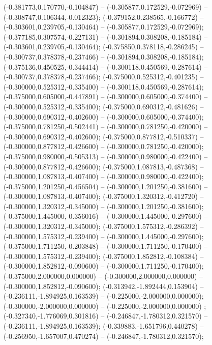  (-0.381773,0.170770,-0.104847) -- (-0.305877,0.172529,-0.072969) -- (-0.308747,0.106344,-0.012323);
 (-0.379152,0.238565,-0.166772) -- (-0.303601,0.239705,-0.130464) -- (-0.305877,0.172529,-0.072969);
 (-0.377185,0.307574,-0.227131) -- (-0.301894,0.308208,-0.185184) -- (-0.303601,0.239705,-0.130464);
 (-0.375850,0.378118,-0.286245) -- (-0.300737,0.378378,-0.237466) -- (-0.301894,0.308208,-0.185184);
 (-0.375136,0.450525,-0.344414) -- (-0.300118,0.450569,-0.287614) -- (-0.300737,0.378378,-0.237466);
 (-0.375000,0.525312,-0.401235) -- (-0.300000,0.525312,-0.335400) -- (-0.300118,0.450569,-0.287614);
 (-0.375000,0.605000,-0.447891) -- (-0.300000,0.605000,-0.374400) -- (-0.300000,0.525312,-0.335400);
 (-0.375000,0.690312,-0.481626) -- (-0.300000,0.690312,-0.402600) -- (-0.300000,0.605000,-0.374400);
 (-0.375000,0.781250,-0.502441) -- (-0.300000,0.781250,-0.420000) -- (-0.300000,0.690312,-0.402600);
 (-0.375000,0.877812,-0.510337) -- (-0.300000,0.877812,-0.426600) -- (-0.300000,0.781250,-0.420000);
 (-0.375000,0.980000,-0.505313) -- (-0.300000,0.980000,-0.422400) -- (-0.300000,0.877812,-0.426600);
 (-0.375000,1.087813,-0.487368) -- (-0.300000,1.087813,-0.407400) -- (-0.300000,0.980000,-0.422400);
 (-0.375000,1.201250,-0.456504) -- (-0.300000,1.201250,-0.381600) -- (-0.300000,1.087813,-0.407400);
 (-0.375000,1.320312,-0.412720) -- (-0.300000,1.320312,-0.345000) -- (-0.300000,1.201250,-0.381600);
 (-0.375000,1.445000,-0.356016) -- (-0.300000,1.445000,-0.297600) -- (-0.300000,1.320312,-0.345000);
 (-0.375000,1.575312,-0.286392) -- (-0.300000,1.575312,-0.239400) -- (-0.300000,1.445000,-0.297600);
 (-0.375000,1.711250,-0.203848) -- (-0.300000,1.711250,-0.170400) -- (-0.300000,1.575312,-0.239400);
 (-0.375000,1.852812,-0.108384) -- (-0.300000,1.852812,-0.090600) -- (-0.300000,1.711250,-0.170400);
 (-0.375000,2.000000,0.000000) -- (-0.300000,2.000000,0.000000) -- (-0.300000,1.852812,-0.090600);
 (-0.313942,-1.892444,0.153904) -- (-0.236111,-1.894925,0.163539) -- (-0.225000,-2.000000,0.000000);
 (-0.300000,-2.000000,0.000000) -- (-0.225000,-2.000000,0.000000) ;
 (-0.327340,-1.776069,0.301816) -- (-0.246847,-1.780312,0.321570) -- (-0.236111,-1.894925,0.163539);
 (-0.339883,-1.651796,0.440278) -- (-0.256950,-1.657007,0.470274) -- (-0.246847,-1.780312,0.321570);
